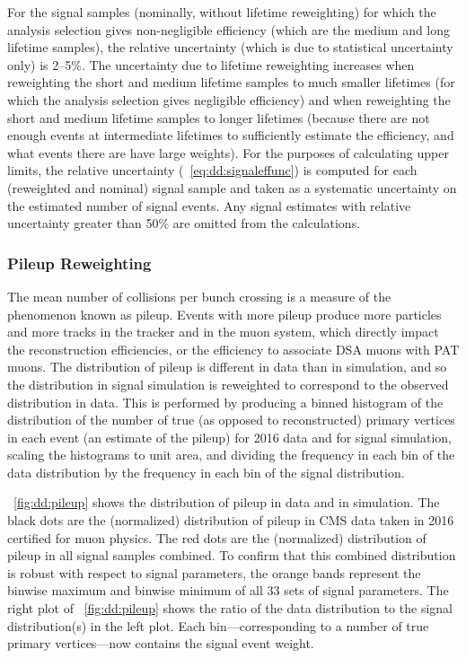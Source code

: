 For the signal samples (nominally, without lifetime reweighting) for which the analysis selection gives non-negligible efficiency (which are the medium and long lifetime samples), the relative uncertainty (which is due to statistical uncertainty only) is 2--5\%.
The uncertainty due to lifetime reweighting increases when reweighting the short and medium lifetime samples to much smaller lifetimes (for which the analysis selection gives negligible efficiency) and when reweighting the short and medium lifetime samples to longer lifetimes (because there are not enough events at intermediate lifetimes to sufficiently estimate the efficiency, and what events there are have large weights).
For the purposes of calculating upper limits, the relative uncertainty (\Eq~\ref{eq:dd:signaleffunc}) is computed for each (reweighted and nominal) signal sample and taken as a systematic uncertainty on the estimated number of signal events.
Any signal estimates with relative uncertainty greater than 50\% are omitted from the calculations.

\subsubsection{Pileup Reweighting}
\label{sec:dd:pileup}
The mean number of \pp collisions per bunch crossing is a measure of the phenomenon known as pileup.
Events with more pileup produce more particles and more tracks in the tracker and in the muon system, which directly impact \eg the reconstruction efficiencies, or the efficiency to associate DSA muons with PAT muons.
The distribution of pileup is different in data than in simulation, and so the distribution in signal simulation is reweighted to correspond to the observed distribution in data. 
This is performed by producing a binned histogram of the distribution of the number of true (as opposed to reconstructed) primary vertices in each event (an estimate of the pileup) for 2016 data and for signal simulation, scaling the histograms to unit area, and dividing the frequency in each bin of the data distribution by the frequency in each bin of the signal distribution.

\Fig~\ref{fig:dd:pileup} shows the distribution of pileup in data and in simulation.
The black dots are the (normalized) distribution of pileup in CMS data taken in 2016 certified for muon physics.
The red dots are the (normalized) distribution of pileup in all \twoMu signal samples combined.
To confirm that this combined distribution is robust with respect to signal parameters, the orange bands represent the binwise maximum and binwise minimum of all 33 sets of signal parameters.
The right plot of \Fig~\ref{fig:dd:pileup} shows the ratio of the data distribution to the signal distribution(s) in the left plot.
Each bin---corresponding to a number of true primary vertices---now contains the signal event weight.

